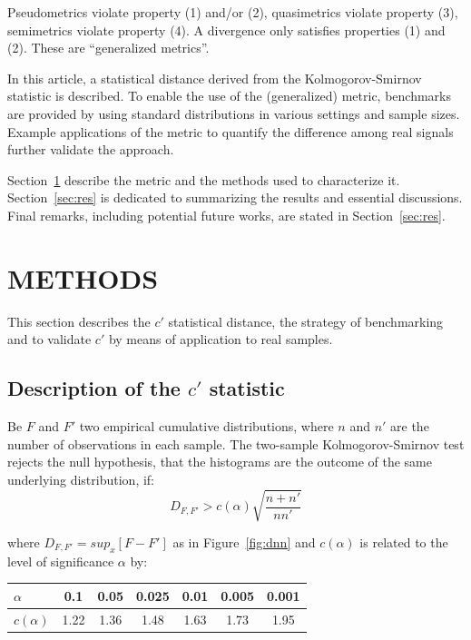 \documentclass[12pt,fleqn]{article}
\begin{document}
Pseudometrics violate property (1) and/or (2),
quasimetrics violate property (3),
semimetrics violate property (4).
A divergence only satisfies properties (1) and (2).
These are ``generalized metrics''.

In this article, a statistical distance derived from the
Kolmogorov-Smirnov statistic is described.
To enable the use of the (generalized) metric,
benchmarks are provided
by using standard distributions in various settings and sample sizes.
Example applications of the metric to quantify the difference among
real signals further validate the approach.

Section~\ref{sec:met} describe the metric
and the methods used to characterize it.
Section~\ref{sec:res} is dedicated to
summarizing the results and essential discussions.
Final remarks, including potential future works,
are stated in Section~\ref{sec:res}.


\section{METHODS}\label{sec:met}
This section describes the $c'$ statistical distance,
the strategy of benchmarking and to validate $c'$ by means
of application to real samples.


\subsection{Description of the $c'$ statistic}\label{sec:desc}
Be $F$ and $F'$ two empirical cumulative distributions,
where $n$ and $n'$ are the number of observations in each sample.
The two-sample Kolmogorov-Smirnov test rejects the null hypothesis,
that the histograms are the outcome of the same underlying distribution,
if:
\begin{equation}\label{eq:ks}
D_{F,F'} > c(\alpha)\sqrt{\frac{n+n'}{nn'}}
\end{equation}

\noindent where $D_{F,F'}=sup_x[F-F']$ as in Figure~\ref{fig:dnn}
and $c(\alpha)$ is related to the level of significance $\alpha$ by:

\begin{table}[h!]
\centering
\begin{tabular}{|l||c|c|c|c|c|c|}\hline
$\alpha$    & 0.1  & 0.05 & 0.025 & 0.01 & 0.005 & 0.001 \\\hline
$c(\alpha)$ & 1.22 & 1.36 & 1.48  & 1.63 & 1.73  & 1.95  \\\hline
\end{tabular}
\end{table}
\end{document}
